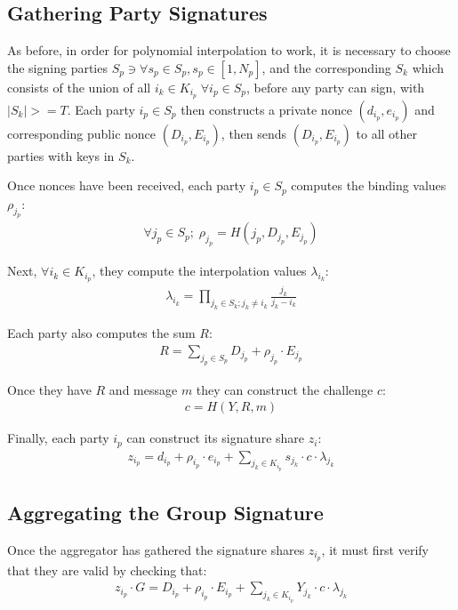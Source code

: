 \documentclass{article}
\begin{document}
\subsection{
  Gathering Party Signatures
}

As before, in order for polynomial interpolation to work, it is necessary to choose the signing parties $S_p \ni \forall s_p \in S_p, s_p \in [1, N_p]$, and the corresponding $S_k$ which consists of the union of all $i_k \in K_{i_p}\; \forall i_p \in S_p$, before any party can sign, with $|S_k| >= T$.  Each party $i_p \in S_p$ then constructs a private nonce $(d_{i_p},e_{i_p})$ and corresponding public nonce $(D_{i_p},E_{i_p})$, then sends $(D_{i_p},E_{i_p})$ to all other parties with keys in $S_k$.

Once nonces have been received, each party $i_p \in S_p$ computes the binding values $\rho_{j_p}$:
\begin{align}
  \forall j_p \in S_p;\;\rho_{j_p} = H(j_p, D_{j_p}, E_{j_p})
\end{align}

Next, $\forall i_k \in K_{i_p}$,  they compute the interpolation values $\lambda_{i_k}$:
\begin{align}
  \lambda_{i_k} = \prod_{j_k \in S_k; j_k \neq i_k}^{} \frac{j_k}{j_k - i_k}
\end{align}

Each party also computes the sum $R$:
\begin{align}
  R = \sum_{j_p \in S_p}^{} D_{j_p} + \rho_{j_p} \cdot E_{j_p}
\end{align}

Once they have $R$ and message $m$ they can construct the challenge $c$:
\begin{align}
  c = H(Y, R, m)
\end{align}

Finally, each party $i_p$ can construct its signature share $z_i$:
\begin{align}
  z_{i_p} = d_{i_p} + \rho_{i_p} \cdot e_{i_p} + \sum_{j_k \in K_{i_p}}^{} s_{j_k} \cdot c \cdot \lambda_{j_k}
\end{align}


\subsection{
  Aggregating the Group Signature
}

Once the aggregator has gathered the signature shares $z_{i_p}$, it must first verify that they are valid by checking that:
\begin{align}
  z_{i_p} \cdot G = D_{i_p} + \rho_{i_p} \cdot E_{i_p} + \sum_{j_k \in K_{i_p}}^{} Y_{j_k} \cdot c \cdot \lambda_{j_k}
\end{align}
\end{document}

